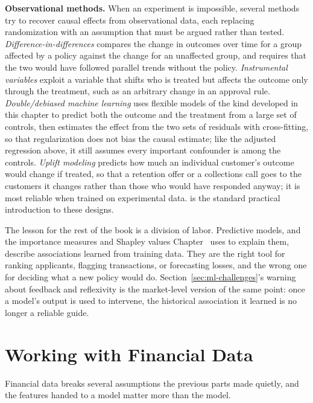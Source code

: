 \documentclass[../ai_in_finance]{subfiles}
\begin{document}
\textbf{Observational methods.} When an experiment is impossible, several methods try to recover causal effects from observational data, each replacing randomization with an assumption that must be argued rather than tested. \emph{Difference-in-differences} compares the change in outcomes over time for a group affected by a policy against the change for an unaffected group, and requires that the two would have followed parallel trends without the policy. \emph{Instrumental variables} exploit a variable that shifts who is treated but affects the outcome only through the treatment, such as an arbitrary change in an approval rule. \emph{Double/debiased machine learning} \parencite{chernozhukov2018double} uses flexible models of the kind developed in this chapter to predict both the outcome and the treatment from a large set of controls, then estimates the effect from the two sets of residuals with cross-fitting, so that regularization does not bias the causal estimate; like the adjusted regression above, it still assumes every important confounder is among the controls. \emph{Uplift modeling} predicts how much an individual customer's outcome would change if treated, so that a retention offer or a collections call goes to the customers it changes rather than those who would have responded anyway; it is most reliable when trained on experimental data. \textcite{angrist2009mostly} is the standard practical introduction to these designs.

The lesson for the rest of the book is a division of labor. Predictive models, and the importance measures and Shapley values Chapter~ uses to explain them, describe associations learned from training data. They are the right tool for ranking applicants, flagging transactions, or forecasting losses, and the wrong one for deciding what a new policy would do. Section~\ref{sec:ml-challenges}'s warning about feedback and reflexivity is the market-level version of the same point: once a model's output is used to intervene, the historical association it learned is no longer a reliable guide.

\section{Working with Financial Data}

Financial data breaks several assumptions the previous parts made quietly, and the features handed to a model matter more than the model.
\end{document}
